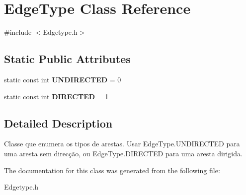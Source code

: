 \hypertarget{classEdgeType}{\section{Edge\-Type Class Reference}
\label{classEdgeType}
}


{\ttfamily \#include $<$Edgetype.\-h$>$}

\subsection*{Static Public Attributes}
\begin{DoxyCompactItemize}
\item 
\hypertarget{classEdgeType_a6533cc56d05c288a550b9980b66c9317}{static const int {\bfseries U\-N\-D\-I\-R\-E\-C\-T\-E\-D} = 0}\label{classEdgeType_a6533cc56d05c288a550b9980b66c9317}

\item 
\hypertarget{classEdgeType_a903017a534f2818c2d17145e4ae0321c}{static const int {\bfseries D\-I\-R\-E\-C\-T\-E\-D} = 1}\label{classEdgeType_a903017a534f2818c2d17145e4ae0321c}

\end{DoxyCompactItemize}


\subsection{Detailed Description}
Classe que enumera os tipos de arestas. Usar Edge\-Type.\-U\-N\-D\-I\-R\-E\-C\-T\-E\-D para uma aresta sem direcção, ou Edge\-Type.\-D\-I\-R\-E\-C\-T\-E\-D para uma aresta dirigida. 

The documentation for this class was generated from the following file\-:\begin{DoxyCompactItemize}
\item 
Edgetype.\-h\end{DoxyCompactItemize}
